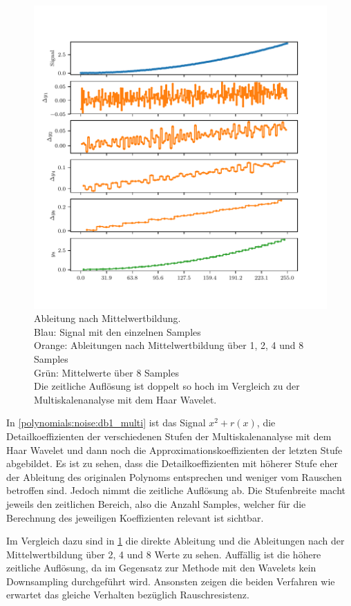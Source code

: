 \begin{refsection}
\begin{figure}
    \includegraphics{papers/polynomials/images/polynomials_noise_moving_average.pdf}
    \caption{Ableitung nach Mittelwertbildung.\\
        Blau: Signal mit den einzelnen Samples\\
        Orange: Ableitungen nach Mittelwertbildung über 1, 2, 4 und 8 Samples\\
        Grün: Mittelwerte über 8 Samples\\
        Die zeitliche Auflösung ist doppelt so hoch im Vergleich zu der
        Multiskalenanalyse mit dem Haar Wavelet.\label{polynomials:noise:average}}
\end{figure}
In \cref{polynomials:noise:db1_multi} ist das Signal $x^2 + r(x)$, die
Detailkoeffizienten der verschiedenen Stufen der Multiskalenanalyse mit dem
Haar Wavelet und dann noch die Approximationskoeffizienten der letzten Stufe
abgebildet. Es ist zu sehen, dass die Detailkoeffizienten mit höherer Stufe
eher der Ableitung des originalen Polynoms entsprechen und weniger vom Rauschen
betroffen sind. Jedoch nimmt die zeitliche Auflösung ab.
Die Stufenbreite macht jeweils den zeitlichen Bereich, also die Anzahl Samples,
welcher für die Berechnung des jeweiligen Koeffizienten relevant ist sichtbar.

Im Vergleich dazu sind in \cref{polynomials:noise:average} die direkte
Ableitung und die Ableitungen nach der Mittelwertbildung über 2, 4 und 8 Werte
zu sehen. Auffällig ist die höhere zeitliche Auflösung, da im Gegensatz zur
Methode mit den Wavelets kein Downsampling durchgeführt wird. Ansonsten zeigen
die beiden Verfahren wie erwartet das gleiche Verhalten bezüglich
Rauschresistenz.


\end{refsection}
